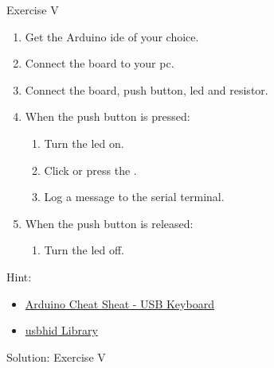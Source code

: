 \begin{frame}
    \begin{exampleblock}{Exercise V}
        \begin{enumerate}
            \item Get the Arduino\textregistered{} \acs{ide} of your choice.
            \item Connect the board to your \acs{pc}.
            \item Connect the board, push button, \acs{led} and resistor.
            \item When the push button is pressed:
                  \begin{enumerate}
                      \item Turn the \acs{led} on.
                      \item Click or press the .
                      \item Log a message to the serial terminal.
                  \end{enumerate}
            \item When the push button is released:
                  \begin{enumerate}
                      \item Turn the \acs{led} off.
                  \end{enumerate}
        \end{enumerate}
        \par Hint:
        \begin{itemize}
            \item \href{https://docs.arduino.cc/tutorials/nano-rp2040-connect/rp2040-01-technical-reference\#usb-keyboard}{Arduino\textregistered{} Cheat Sheat - USB Keyboard}
            \item \href{https://github.com/arduino/ArduinoCore-mbed/tree/main/libraries/USBHID}{\acs{usb}\acs{hid} Library}
        \end{itemize}
    \end{exampleblock}
\end{frame}

\begin{frame}{Solution: Exercise V}
    \begin{listing}[H]
        \caption{Solution for Exercise V (pin mode: \texttt{INPUT}).}
        \label{lst:arduino:exercise:5:solution:pullup}
    \end{listing}
\end{frame}

